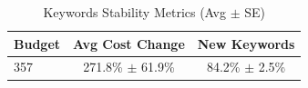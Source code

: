 \begin{table}[htbp]
\centering
\caption{Keywords Stability Metrics (Avg $\pm$ SE)}
\begin{tabular}{lcc}
\toprule
Budget & Avg Cost Change & New Keywords \\
\midrule
357 & 271.8\% $\pm$ 61.9\% & 84.2\% $\pm$ 2.5\% \\
\bottomrule
\end{tabular}
\end{table}